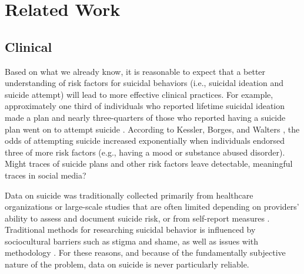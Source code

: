 \documentclass[11pt]{article}
\begin{document}

\section{Related Work}
\subsection{Clinical}
Based on what we already know, it is reasonable to expect that a better understanding of risk factors for suicidal behaviors (i.e., suicidal ideation and suicide attempt) will lead to more effective clinical practices. For example, approximately one third of individuals who reported lifetime suicidal ideation made a plan and nearly three-quarters of those who reported having a suicide plan went on to attempt suicide \cite{kessler1999prevalence}. According to Kessler, Borges, and Walters  \cite{kessler1999prevalence}, the odds of attempting suicide increased exponentially when individuals endorsed three of more risk factors (e.g., having a mood or substance abused disorder). Might traces of suicide plans and other risk factors leave detectable, meaningful traces in social media?

Data on suicide was traditionally collected primarily from healthcare organizations or large-scale studies that are often limited depending on providers' ability to assess and document suicide risk, or from self-report measures \cite{crosby2011self,horowitz2009suicide}.  Traditional methods for researching suicidal behavior is influenced by sociocultural barriers such as stigma and shame, as well as issues with methodology \cite{crosby2011self}. For these reasons, and because of the fundamentally subjective nature of the problem, data on suicide is never particularly reliable. 
\end{document}
